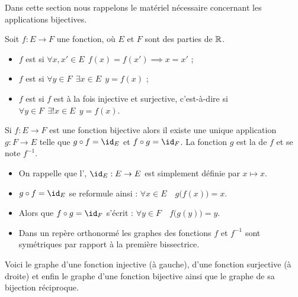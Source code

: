 \documentclass[class=report,crop=false]{standalone}
\begin{document}
Dans cette section nous rappelons le matériel nécessaire concernant les applications bijectives.

\begin{definition}
Soit $f:E\to F$ une fonction, où $E$ et $F$ sont des parties de $\mathbb{R}$.
\begin{itemize}
  \item $f$ est  si $\forall x,x'\in E \ \ f(x)=f(x') \implies x=x'$ ;
  \item $f$ est  si $\forall y\in F \ \ \exists x\in E \ \ y=f(x)$ ;
  \item $f$ est  si $f$ est à la fois injective et surjective,
  c'est-à-dire si $\forall y\in F \ \ \exists! x\in E \ \ y=f(x)$.
\end{itemize}
\end{definition}

\begin{proposition}
Si $f :  E \to F$ est une fonction bijective alors il existe une
unique application $g : F \to E$ telle que $g\circ f = \id_E$ et $f\circ g = \id_F$.
La fonction $g$ est la  de $f$ et se note $f^{-1}$.
\end{proposition}

\begin{remarque*}
\sauteligne
\begin{itemize}
  \item On rappelle que l', $\id_E : E \to E$ est simplement définie par $x \mapsto x$.

  \item $g \circ f = \id_E$ se reformule ainsi : $\forall x \in E\quad  g\big(f(x)\big) = x$.

  \item  Alors que $f \circ g = \id_F$  s'écrit : $\forall y \in F\quad  f\big(g(y)\big) = y$.

  \item Dans un repère orthonormé les graphes des fonctions $f$ et $f^{-1}$ sont symétriques
  par rapport à la première bissectrice.
\end{itemize}

\end{remarque*}

Voici le graphe d'une fonction injective (à gauche), d'une fonction surjective (à droite) et 
enfin le graphe d'une fonction bijective ainsi que le graphe de sa bijection réciproque.
\end{document}
